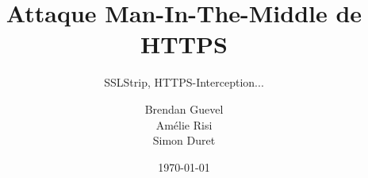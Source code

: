 \documentclass{beamer}
\title[Attaques sur HTTPS]{Attaque Man-In-The-Middle de HTTPS}
\subtitle{SSLStrip, HTTPS-Interception...}
\author[B. Guevel - A. Risi - S. Duret]{Brendan Guevel\\Amélie Risi\\Simon Duret}
\institute[]{Université de Bordeaux}
\date{\today}
\begin{document}
\begin{frame}
  \titlepage
\end{frame}
\end{document}
